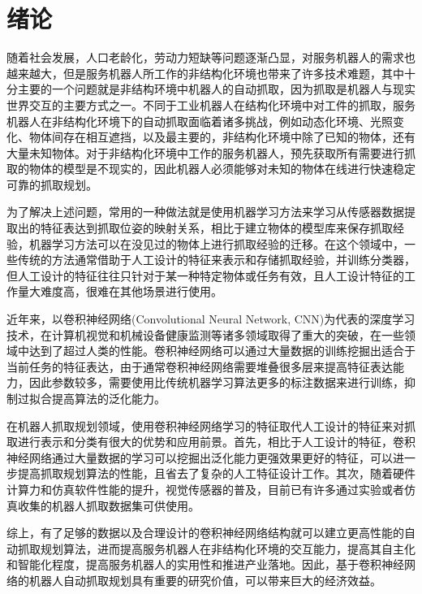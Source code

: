 \documentclass{hitszthesis}
\begin{document}
\chapter{绪论}

随着社会发展，人口老龄化，劳动力短缺等问题逐渐凸显，对服务机器人的需求也越来越大，但是服务机器人所工作的非结构化环境也带来了许多技术难题，其中十分主要的一个问题就是非结构环境中机器人的自动抓取，因为抓取是机器人与现实世界交互的主要方式之一。不同于工业机器人在结构化环境中对工件的抓取，服务机器人在非结构化环境下的自动抓取面临着诸多挑战，例如动态化环境、光照变化、物体间存在相互遮挡，以及最主要的，非结构化环境中除了已知的物体，还有大量未知物体。对于非结构化环境中工作的服务机器人，预先获取所有需要进行抓取的物体的模型是不现实的，因此机器人必须能够对未知的物体在线进行快速稳定可靠的抓取规划。

为了解决上述问题，常用的一种做法就是使用机器学习方法来学习从传感器数据提取出的特征表达到抓取位姿的映射关系，相比于建立物体的模型库来保存抓取经验，机器学习方法可以在没见过的物体上进行抓取经验的迁移。在这个领域中，一些传统的方法通常借助于人工设计的特征来表示和存储抓取经验，并训练分类器，但人工设计的特征往往只针对于某一种特定物体或任务有效，且人工设计特征的工作量大难度高，很难在其他场景进行使用。
 
近年来，以卷积神经网络(Convolutional Neural Network, CNN)为代表的深度学习技术，在计算机视觉和机械设备健康监测等诸多领域取得了重大的突破，在一些领域中达到了超过人类的性能。卷积神经网络可以通过大量数据的训练挖掘出适合于当前任务的特征表达，由于通常卷积神经网络需要堆叠很多层来提高特征表达能力，因此参数较多，需要使用比传统机器学习算法更多的标注数据来进行训练，抑制过拟合提高算法的泛化能力。

在机器人抓取规划领域，使用卷积神经网络学习的特征取代人工设计的特征来对抓取进行表示和分类有很大的优势和应用前景。首先，相比于人工设计的特征，卷积神经网络通过大量数据的学习可以挖掘出泛化能力更强效果更好的特征，可以进一步提高抓取规划算法的性能，且省去了复杂的人工特征设计工作。其次，随着硬件计算力和仿真软件性能的提升，视觉传感器的普及，目前已有许多通过实验或者仿真收集的机器人抓取数据集可供使用。
 
综上，有了足够的数据以及合理设计的卷积神经网络结构就可以建立更高性能的自动抓取规划算法，进而提高服务机器人在非结构化环境的交互能力，提高其自主化和智能化程度，提高服务机器人的实用性和推进产业落地。因此，基于卷积神经网络的机器人自动抓取规划具有重要的研究价值，可以带来巨大的经济效益。
\end{document}
